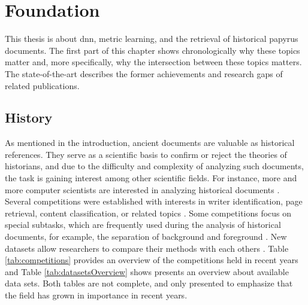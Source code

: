 \chapter{Foundation}
\label{chap:Foundation}
This thesis is about \ac{dnn}, metric learning, and the retrieval of historical papyrus documents. The first part of this chapter shows chronologically why these topics matter and, more specifically, why the intersection between these topics matters. The state-of-the-art describes the former achievements and research gaps of related publications.
%
\section{History}
\label{sec:history}
As mentioned in the introduction, ancient documents are valuable as historical references. They serve as a scientific basis to confirm or reject the theories of historians, and due to the difficulty and complexity of analyzing such documents, the task is gaining interest among other scientific fields. For instance, more and more computer scientists are interested in analyzing historical documents \cite{Fiorucci20}. Several competitions were established with interests in writer identification, page retrieval, content classification, or related topics \cite{Christlein19, Cloppet17, Fiel17, Seuret20, Seuret21}. Some competitions focus on special subtasks, which are frequently used during the analysis of historical documents, for example, the separation of background and foreground \cite{Tensmeyer20}.
New datasets allow researchers to compare their methods with each others \cite{Fiorucci20, Pratikakis19}. Table \ref{tab:competitions} provides an overview of the competitions held in recent years and Table \ref{tab:datasetsOverview} shows presents an overview about available data sets. Both tables are not complete, and only presented to emphasize that the field has grown in importance in recent years.\\

